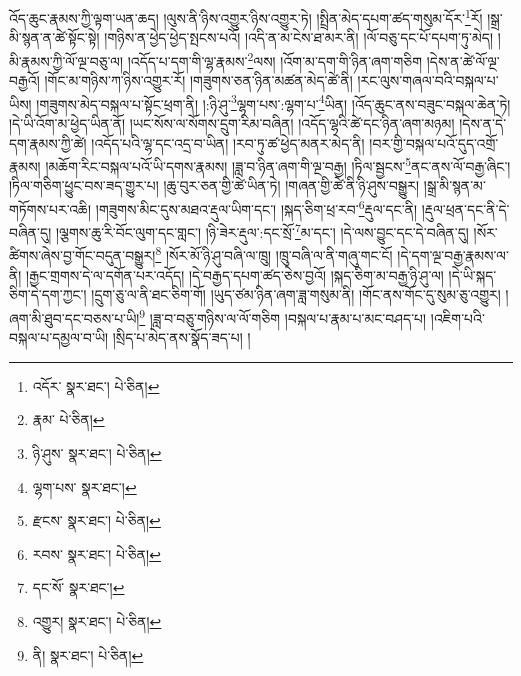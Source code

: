 འོད་ཆུང་རྣམས་ཀྱི་ལྟག་ཡན་ཆད། །ལུས་ནི་ཉིས་འགྱུར་ཉིས་འགྱུར་ཏེ། །སྤྲིན་མེད་དཔག་ཚད་གསུམ་དོར་\footnote{འདོར་  སྣར་ཐང་།  པེ་ཅིན། }རོ། །སྒྲ་མི་སྙན་ན་ཚེ་སྟོང་སྟེ། །གཉིས་ན་ཕྱེད་ཕྱེད་སྤངས་པའོ། །འདི་ན་མ་ངེས་ཐ་མར་ནི། །ལོ་བཅུ་དང་པོ་དཔག་ཏུ་མེད། །མི་རྣམས་ཀྱི་ལོ་ལྔ་བཅུ་ལ། །འདོད་པ་དག་གི་ལྷ་རྣམས་\footnote{རྣམ་  པེ་ཅིན། }ལས། །འོག་མ་དག་གི་ཉིན་ཞག་གཅིག །དེས་ན་ཚེ་ལོ་ལྔ་བརྒྱའོ། །གོང་མ་གཉིས་ཀ་ཉིས་འགྱུར་རོ། །གཟུགས་ཅན་ཉིན་མཚན་མེད་ཚེ་ནི། །རང་ལུས་གཞལ་བའི་བསྐལ་པ་ཡིས། །གཟུགས་མེད་བསྐལ་པ་སྟོང་ཕྲག་ནི། །:ཉི་ཤུ་\footnote{ཉི་ཤུས་  སྣར་ཐང་།  པེ་ཅིན། }ལྷག་པས་:ལྷག་པ་\footnote{ལྷག་པས་  སྣར་ཐང་། }ཡིན། །འོད་ཆུང་ནས་བཟུང་བསྐལ་ཆེན་ཏེ། །དེ་ཡི་འོག་མ་ཕྱེད་ཡིན་ནོ། །ཡང་སོས་ལ་སོགས་དྲུག་རིམ་བཞིན། །འདོད་ལྷའི་ཚེ་དང་ཉིན་ཞག་མཉམ། །དེས་ན་དེ་དག་རྣམས་ཀྱི་ཚེ། །འདོད་པའི་ལྷ་དང་འདྲ་བ་ཡིན། །རབ་ཏུ་ཚ་ཕྱེད་མནར་མེད་ནི། །བར་གྱི་བསྐལ་པའོ་དུད་འགྲོ་རྣམས། །མཆོག་རིང་བསྐལ་པའོ་ཡི་དགས་རྣམས། །ཟླ་བ་ཉིན་ཞག་གི་ལྔ་བརྒྱ། །ཏིལ་སྦྱངས་\footnote{རྫངས་  སྣར་ཐང་།  པེ་ཅིན། }ནང་ནས་ལོ་བརྒྱ་ཞིང་། །ཏིལ་གཅིག་ཕྱུང་བས་ཟད་གྱུར་པ། །ཆུ་བུར་ཅན་གྱི་ཚེ་ཡིན་ཏེ། །གཞན་གྱི་ཚེ་ནི་ཉི་ཤུས་བསྒྱུར། །སྒྲ་མི་སྙན་མ་གཏོགས་པར་འཆི། །གཟུགས་མིང་དུས་མཐའ་རྡུལ་ཡིག་དང་། །སྐད་ཅིག་ཕྲ་རབ་\footnote{རབས་  སྣར་ཐང་།  པེ་ཅིན། }རྡུལ་དང་ནི། །རྡུལ་ཕྲན་དང་ནི་དེ་བཞིན་དུ། །ལྕགས་ཆུ་རི་བོང་ལུག་དང་གླང་། །ཉི་ཟེར་རྡུལ་:དང་སྲོ་\footnote{དང་སོ་  སྣར་ཐང་། }མ་དང་། །དེ་ལས་བྱུང་དང་དེ་བཞིན་དུ། །སོར་ཚིགས་ཞེས་བྱ་གོང་བདུན་བསྒྱུར།\footnote{འགྱུར།  སྣར་ཐང་།  པེ་ཅིན། } །སོར་མོ་ཉི་ཤུ་བཞི་ལ་ཁྲུ། །ཁྲུ་བཞི་ལ་ནི་གཞུ་གང་ངོ། །དེ་དག་ལྔ་བརྒྱ་རྣམས་ལ་ནི། །རྒྱང་གྲགས་དེ་ལ་དགོན་པར་འདོད། །དེ་བརྒྱད་དཔག་ཚད་ཅེས་བྱའོ། །སྐད་ཅིག་མ་བརྒྱ་ཉི་ཤུ་ལ། །དེ་ཡི་སྐད་ཅིག་དེ་དག་ཀྱང་། །དྲུག་ཅུ་ལ་ནི་ཐང་ཅིག་གོ། །ཡུད་ཙམ་ཉིན་ཞག་ཟླ་གསུམ་ནི། །གོང་ནས་གོང་དུ་སུམ་ཅུ་འགྱུར། །ཞག་མི་ཐུབ་དང་བཅས་པ་ཡི།\footnote{ནི།  སྣར་ཐང་།  པེ་ཅིན། } །ཟླ་བ་བཅུ་གཉིས་ལ་ལོ་གཅིག །བསྐལ་པ་རྣམ་པ་མང་བཤད་པ། །འཇིག་པའི་བསྐལ་པ་དམྱལ་བ་ཡི། །སྲིད་པ་མེད་ནས་སྣོད་ཟད་པ། །

